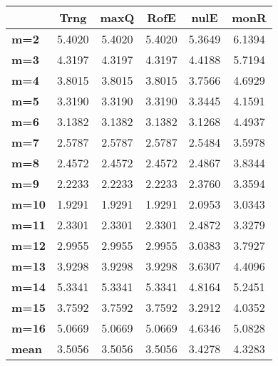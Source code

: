 \begin{tabular}{|l|c|c|c|c|c|}
\hline
&\textbf{Trng}&\textbf{maxQ}&\textbf{RofE}&\textbf{nulE}&\textbf{monR}\\\hline
\textbf{m=2}&5.4020&5.4020&5.4020&5.3649&6.1394\\\hline
\textbf{m=3}&4.3197&4.3197&4.3197&4.4188&5.7194\\\hline
\textbf{m=4}&3.8015&3.8015&3.8015&3.7566&4.6929\\\hline
\textbf{m=5}&3.3190&3.3190&3.3190&3.3445&4.1591\\\hline
\textbf{m=6}&3.1382&3.1382&3.1382&3.1268&4.4937\\\hline
\textbf{m=7}&2.5787&2.5787&2.5787&2.5484&3.5978\\\hline
\textbf{m=8}&2.4572&2.4572&2.4572&2.4867&3.8344\\\hline
\textbf{m=9}&2.2233&2.2233&2.2233&2.3760&3.3594\\\hline
\textbf{m=10}&1.9291&1.9291&1.9291&2.0953&3.0343\\\hline
\textbf{m=11}&2.3301&2.3301&2.3301&2.4872&3.3279\\\hline
\textbf{m=12}&2.9955&2.9955&2.9955&3.0383&3.7927\\\hline
\textbf{m=13}&3.9298&3.9298&3.9298&3.6307&4.4096\\\hline
\textbf{m=14}&5.3341&5.3341&5.3341&4.8164&5.2451\\\hline
\textbf{m=15}&3.7592&3.7592&3.7592&3.2912&4.0352\\\hline
\textbf{m=16}&5.0669&5.0669&5.0669&4.6346&5.0828\\\hline
\textbf{mean}&3.5056&3.5056&3.5056&3.4278&4.3283\\\hline
\end{tabular}

